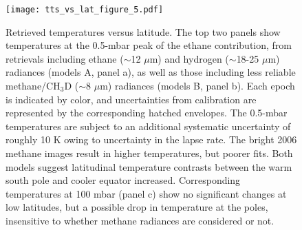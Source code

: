 \documentclass[twocolumn,10pt]{aastex631}
\begin{document}

\begin{figure}[h]
    \centering
    \texttt{[image: tts\_vs\_lat\_figure\_5.pdf]}
    \caption{Retrieved temperatures versus latitude. The top two panels show temperatures at the 0.5-mbar peak of the ethane contribution, from retrievals including ethane ($\sim$12 $\mu$m) and hydrogen ($\sim$18-25 $\mu$m) radiances (models A, panel a), as well as those including less reliable methane/CH$_3$D ($\sim$8 $\mu$m) radiances (models B, panel b). Each epoch is indicated by color, and uncertainties from calibration are represented by the corresponding hatched envelopes. The 0.5-mbar temperatures are subject to an additional systematic uncertainty of roughly 10 K owing to uncertainty in the lapse rate.  The bright 2006 methane images result in higher temperatures, but poorer fits. Both models suggest latitudinal temperature contrasts between the warm south pole and cooler equator increased. Corresponding temperatures at 100 mbar (panel c) show no significant changes at low latitudes, but a possible drop in temperature at the poles, insensitive to whether methane radiances are considered or not.}
    \label{fig:tts_vs_lat} 
\end{figure}
\end{document}
